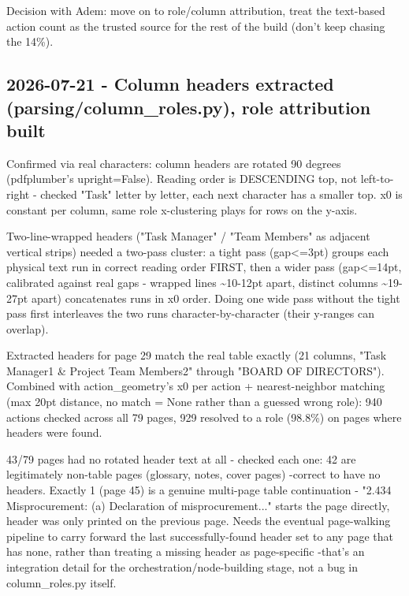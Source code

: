 Decision with Adem: move on to role/column attribution, treat the text-based action count as the trusted source for the rest of the build (don't keep chasing the 14\%).

\subsection*{2026-07-21 - Column headers extracted (parsing/column\_roles.py), role attribution built}
Confirmed via real characters: column headers are rotated 90 degrees (pdfplumber's upright=False). Reading order is DESCENDING top, not left-to-right - checked "Task" letter by letter, each next character has a smaller top. x0 is constant per column, same role x-clustering plays for rows on the y-axis.

Two-line-wrapped headers ("Task Manager" / "Team Members" as adjacent vertical strips) needed a two-pass cluster: a tight pass (gap<=3pt) groups each physical text run in correct reading order FIRST, then a wider pass (gap<=14pt, calibrated against real gaps - wrapped lines \textasciitilde{}10-12pt apart, distinct columns \textasciitilde{}19-27pt apart) concatenates runs in x0 order. Doing one wide pass without the tight pass first interleaves the two runs character-by-character (their y-ranges can overlap).

Extracted headers for page 29 match the real table exactly (21 columns, "Task Manager1 \& Project Team Members2" through "BOARD OF DIRECTORS"). Combined with action\_geometry's x0 per action + nearest-neighbor matching (max 20pt distance, no match = None rather than a guessed wrong role): 940 actions checked across all 79 pages, 929 resolved to a role (98.8\%) on pages where headers were found.

43/79 pages had no rotated header text at all - checked each one: 42 are legitimately non-table pages (glossary, notes, cover pages) -correct to have no headers. Exactly 1 (page 45) is a genuine multi-page table continuation - "2.434 Misprocurement: (a) Declaration of misprocurement..." starts the page directly, header was only printed on the previous page. Needs the eventual page-walking pipeline to carry forward the last successfully-found header set to any page that has none, rather than treating a missing header as page-specific -that's an integration detail for the orchestration/node-building stage, not a bug in column\_roles.py itself.

